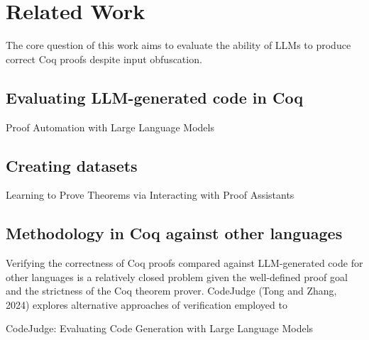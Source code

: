 
\section{Related Work}
\label{sec:related-work}

The core question of this work aims to evaluate
the ability of LLMs to produce correct Coq proofs
despite input obfuscation.

\subsection
{Evaluating LLM-generated code in Coq}
Proof Automation with Large Language Models

\subsection
{Creating datasets}
Learning to Prove Theorems via
Interacting with Proof Assistants


\subsection
{Methodology in Coq against other languages}

Verifying the correctness of Coq proofs
compared against LLM-generated code for other
languages is a relatively closed problem
given the well-defined proof goal and the
strictness of the Coq theorem prover.
CodeJudge (Tong and Zhang, 2024) explores
alternative approaches of verification
employed to 

CodeJudge: Evaluating Code Generation 
with Large Language Models